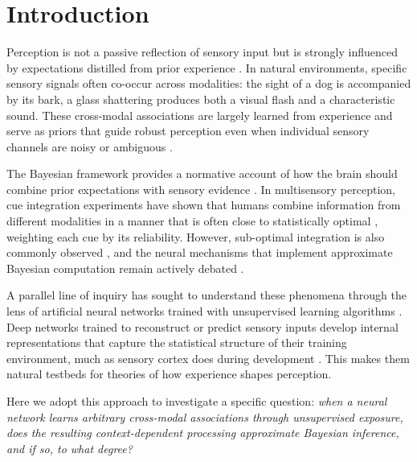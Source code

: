 \documentclass[11pt,a4paper]{article}
\begin{document}
\section{Introduction}

Perception is not a passive reflection of sensory input but is strongly influenced by expectations distilled from prior experience \citep{knill2004bayesian, fiser2010statistically}.
In natural environments, specific sensory signals often co-occur across modalities: the sight of a dog is accompanied by its bark, a glass shattering produces both a visual flash and a characteristic sound.
These cross-modal associations are largely learned from experience and serve as priors that guide robust perception even when individual sensory channels are noisy or ambiguous \citep{noppeney2021perceptual, spence2011crossmodal}.

The Bayesian framework provides a normative account of how the brain should combine prior expectations with sensory evidence \citep{knill2004bayesian}.
In multisensory perception, cue integration experiments have shown that humans combine information from different modalities in a manner that is often close to statistically optimal \citep{ernst2002humans, alais2004ventriloquist}, weighting each cue by its reliability.
However, sub-optimal integration is also commonly observed \citep{rahnev2011suboptimality, drugowitsch2016computational}, and the neural mechanisms that implement approximate Bayesian computation remain actively debated \citep{fiser2010statistically, pouget2013probabilistic}.

A parallel line of inquiry has sought to understand these phenomena through the lens of artificial neural networks trained with unsupervised learning algorithms \citep{richards2019deep, matteucci2024unsupervised}.
Deep networks trained to reconstruct or predict sensory inputs develop internal representations that capture the statistical structure of their training environment, much as sensory cortex does during development \citep{matteucci2020unsupervised, berkes2011spontaneous}.
This makes them natural testbeds for theories of how experience shapes perception.

Here we adopt this approach to investigate a specific question: \emph{when a neural network learns arbitrary cross-modal associations through unsupervised exposure, does the resulting context-dependent processing approximate Bayesian inference, and if so, to what degree?}
\end{document}
